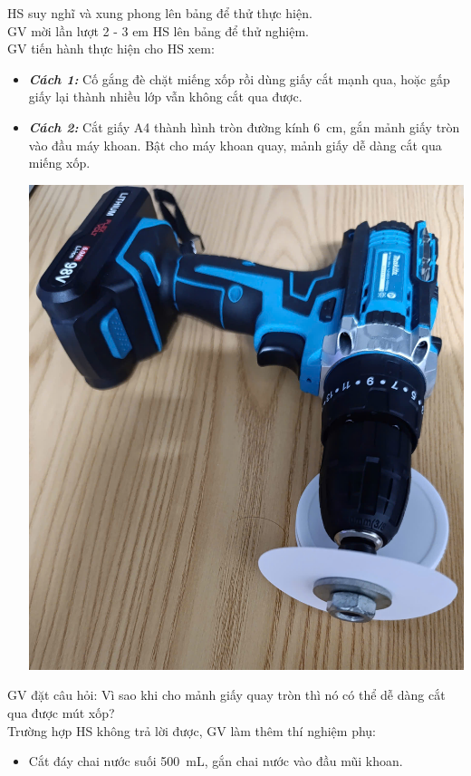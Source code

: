{\begin{itemize}
\begin{center}
		\end{center}
		HS suy nghĩ và xung phong lên bảng để thử thực hiện.\\
		GV mời lần lượt 2 - 3 em HS lên bảng để thử nghiệm.\\
		GV tiến hành thực hiện cho HS xem:
		\begin{itemize}
			\item \textbf{\textit{Cách 1:}} Cố gắng đè chặt miếng xốp rồi dùng giấy cắt mạnh qua, hoặc gấp giấy lại thành nhiều lớp vẫn không cắt qua được.
			\item \textbf{\textit{Cách 2:}} Cắt giấy A4 thành hình tròn đường kính \SI{6}{\centi\meter}, gắn mảnh giấy tròn vào đầu máy khoan. Bật cho máy khoan quay, mảnh giấy dễ dàng cắt qua miếng xốp.
			\begin{center}
				\includegraphics[scale=0.1]{figs/G10-BAI21-5}
			\end{center}
		\end{itemize}
		GV đặt câu hỏi: Vì sao khi cho mảnh giấy quay tròn thì nó có thể dễ dàng cắt qua được mút xốp?\\
		Trường hợp HS không trả lời được, GV làm thêm thí nghiệm phụ:
		\begin{itemize}
			\item Cắt đáy chai nước suối \SI{500}{\milli\liter}, gắn chai nước vào đầu mũi khoan.

\end{itemize}
\end{itemize}}
